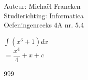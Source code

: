 \documentclass[a4paper]{article}
\newcommand{\dint}{\displaystyle\int}
\begin{document}
\noindent \large Auteur: Michaël Francken \\
\noindent \large Studierichting: Informatica\\
\noindent \large Oefeningenreeks 4A nr. 5.4\\

\medskip 

\normalsize

$\dint\left(x^3 +1\right)dx$\\

$=\dfrac{x^4}{4}+x+c$\\

\begin{thebibliography}{999}
\end{thebibliography}
\end{document}
